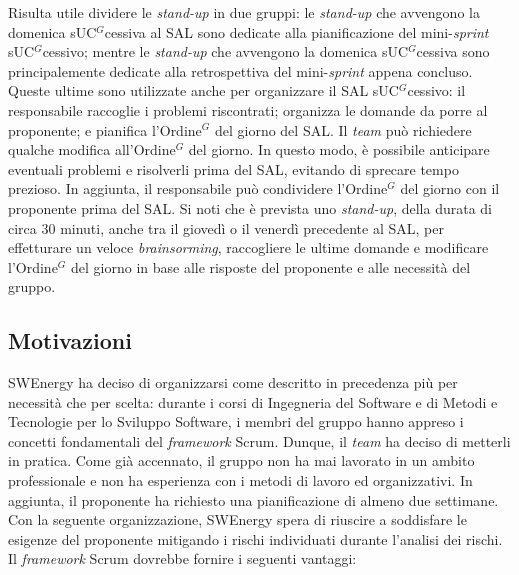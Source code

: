 Risulta utile dividere le \textit{stand-up} in due gruppi: le \textit{stand-up}
che avvengono la domenica s\gls{UC}$^G$cessiva al SAL sono dedicate alla pianificazione
del mini-\textit{sprint} s\gls{UC}$^G$cessivo; mentre le \textit{stand-up} che avvengono
la domenica s\gls{UC}$^G$cessiva sono principalemente dedicate alla retrospettiva del
mini-\textit{sprint} appena concluso. Queste ultime sono utilizzate anche per
organizzare il SAL s\gls{UC}$^G$cessivo: il responsabile raccoglie i problemi riscontrati;
organizza le domande da porre al proponente; e pianifica l'\gls{Ordine}$^G$ del giorno del
SAL. Il \textit{team} può richiedere qualche modifica all'\gls{Ordine}$^G$ del giorno. In
questo modo, è possibile anticipare eventuali problemi e risolverli prima del
SAL, evitando di sprecare tempo prezioso. In aggiunta, il responsabile può
condividere l'\gls{Ordine}$^G$ del giorno con il proponente prima del SAL. Si noti
che è prevista uno \textit{stand-up}, della durata di circa 30
minuti, anche tra il giovedì o il venerdì precedente al SAL, per effetturare un
veloce \textit{brainsorming}, raccogliere le ultime domande e modificare
l'\gls{Ordine}$^G$ del giorno in base alle risposte del proponente e alle necessità del
gruppo.

\subsection{Motivazioni}

SWEnergy ha deciso di organizzarsi come descritto in precedenza più per
necessità che per scelta: durante i corsi di Ingegneria del Software e di Metodi
e Tecnologie per lo Sviluppo Software, i membri del gruppo hanno appreso i
concetti fondamentali del \textit{framework} Scrum. Dunque, il \textit{team} ha
deciso di metterli in pratica. Come già accennato, il gruppo non ha mai lavorato
in un ambito professionale e non ha esperienza con i metodi di lavoro ed
organizzativi. In aggiunta, il proponente ha richiesto una pianificazione di
almeno due settimane.
Con la seguente organizzazione, SWEnergy spera di riuscire a soddisfare le
esigenze del proponente mitigando i rischi individuati durante l'analisi dei
rischi. Il \textit{framework} Scrum dovrebbe fornire i seguenti vantaggi:

